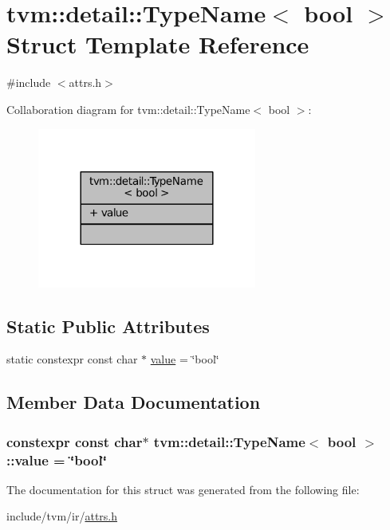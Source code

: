 \hypertarget{structtvm_1_1detail_1_1TypeName_3_01bool_01_4}{}\section{tvm\+:\+:detail\+:\+:Type\+Name$<$ bool $>$ Struct Template Reference}
\label{structtvm_1_1detail_1_1TypeName_3_01bool_01_4}


{\ttfamily \#include $<$attrs.\+h$>$}



Collaboration diagram for tvm\+:\+:detail\+:\+:Type\+Name$<$ bool $>$\+:
\nopagebreak
\begin{figure}[H]
\begin{center}
\leavevmode
\includegraphics[width=204pt]{structtvm_1_1detail_1_1TypeName_3_01bool_01_4__coll__graph}
\end{center}
\end{figure}
\subsection*{Static Public Attributes}
\begin{DoxyCompactItemize}
\item 
static constexpr const char $\ast$ \hyperlink{structtvm_1_1detail_1_1TypeName_3_01bool_01_4_a4ec09fca4aca8d1750d479c360f69c58}{value} = \char`\"{}bool\char`\"{}
\end{DoxyCompactItemize}


\subsection{Member Data Documentation}
\subsubsection[{\texorpdfstring{value}{value}}]{\setlength{\rightskip}{0pt plus 5cm}constexpr const char$\ast$ {\bf tvm\+::detail\+::\+Type\+Name}$<$ bool $>$\+::value = \char`\"{}bool\char`\"{}\hspace{0.3cm}{\ttfamily [static]}}\hypertarget{structtvm_1_1detail_1_1TypeName_3_01bool_01_4_a4ec09fca4aca8d1750d479c360f69c58}{}\label{structtvm_1_1detail_1_1TypeName_3_01bool_01_4_a4ec09fca4aca8d1750d479c360f69c58}


The documentation for this struct was generated from the following file\+:\begin{DoxyCompactItemize}
\item 
include/tvm/ir/\hyperlink{ir_2attrs_8h}{attrs.\+h}\end{DoxyCompactItemize}
